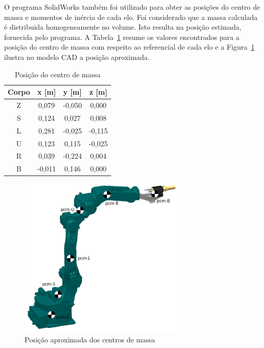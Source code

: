 O programa SolidWorks também foi utilizado para obter as posições do centro de
massa e momentos de inércia de cada elo.
Foi considerado que a massa calculada é distribuida homogeneamente no volume.
Isto resulta na posição estimada, fornecida pelo programa. A
Tabela~\ref{tab::resumo_cm} resume os valores encontrados para a posição do
centro de massa com respeito ao referencial de cada elo e a
Figura~\ref{fig::pcm_mh12} ilustra no modelo CAD a posição aproximada.
%
\begin{table}[h]
\centering
\caption{Posição do centro de massa}
\label{tab::resumo_cm}
\begin{tabular}{@{}cccc@{}}
\toprule
\textbf{Corpo} & \textbf{x [m]} & \textbf{y [m]} & \textbf{z [m]} \\ \midrule
Z              & 0,079      & -0,050     & 0,000      \\
S              & 0,124      & 0,027      & 0,008      \\
L              & 0,281      & -0,025     & -0,115     \\
U              & 0,123      & 0,115      & -0,025     \\
R              & 0,039      & -0,224     & 0,004      \\
B              & -0,011     & 0,146      & 0,000      \\ \bottomrule
\end{tabular}
\end{table}
%

\begin{figure}[h]
	\centering 
 	\includegraphics[width=0.7\textwidth]{figs/pcm_mh12}
 	\caption{Posição aproximada dos centros de massa}
 	\label{fig::pcm_mh12}
\end{figure}

